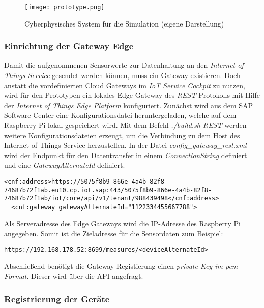 \begin{figure}[H]
  \centering
  \texttt{[image: prototype.png]}
  \caption[Cyberphysisches System für die Simulation]{Cyberphysisches System für die Simulation (eigene Darstellung)}
  \label{raspi}
\end{figure}


\subsubsection{Einrichtung der Gateway Edge}

Damit die aufgenommenen Sensorwerte zur Datenhaltung an den \textit{Internet of Things Service} gesendet werden können, muss ein Gateway existieren. Doch anstatt die vordefinierten Cloud Gateways im \textit{IoT Service Cockpit} zu nutzen, wird für den Prototypen ein lokales Edge Gateway des \textit{REST}-Protokolls mit Hilfe der \textit{Internet of Things Edge Platform} konfiguriert. Zunächst wird aus dem SAP Software Center eine Konfigurationsdatei heruntergeladen, welche auf dem Raspberry Pi lokal gespeichert wird. Mit dem Befehl \textit{./build.sh REST} werden weitere Konfigurationsdateien erzeugt, um die Verbindung zu dem Host des Internet of Things Service herzustellen. In der Datei \textit{config\_gateway\_rest.xml} wird der Endpunkt für den Datentransfer in einem \textit{ConnectionString} definiert und eine \textit{GatewayAlternateId} definiert.

\begin{lstlisting}[caption= Gateway-Verbindung zur Cloud]
  <cnf:address>https://5075f8b9-866e-4a4b-82f8-74687b72f1ab.eu10.cp.iot.sap:443/5075f8b9-866e-4a4b-82f8-74687b72f1ab/iot/core/api/v1/tenant/988439498</cnf:address>
  <cnf:gateway gatewayAlternateId="1122334455667788">
\end{lstlisting}
Als Serveradresse des Edge Gateways wird die IP-Adresse des Raspberry Pi angegeben. Somit ist die Zieladresse für die Sensordaten zum Beispiel:

\begin{lstlisting}[caption= Zieladresse für Sensorwerte]
  https://192.168.178.52:8699/measures/<deviceAlternateId>\end{lstlisting}

Abschließend benötigt die Gateway-Registierung einen \textit{private Key im pem-Format}. Dieser wird über die API angefragt.
\subsubsection{Registrierung der Geräte}

